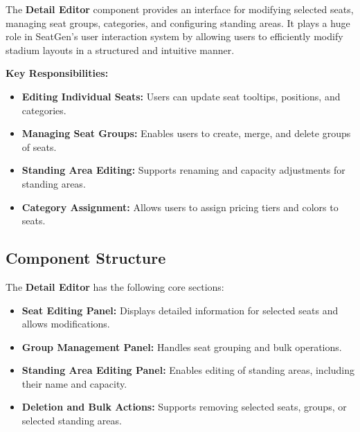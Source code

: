 The \textbf{Detail Editor} component provides an interface for modifying selected seats, managing seat groups, categories, and configuring standing areas. It plays a huge role in SeatGen’s user interaction system by allowing users to efficiently modify stadium layouts in a structured and intuitive manner.

\textbf{Key Responsibilities:}
\begin{itemize}
    \item \textbf{Editing Individual Seats:} Users can update seat tooltips, positions, and categories.
    \item \textbf{Managing Seat Groups:} Enables users to create, merge, and delete groups of seats.
    \item \textbf{Standing Area Editing:} Supports renaming and capacity adjustments for standing areas.
    \item \textbf{Category Assignment:} Allows users to assign pricing tiers and colors to seats.
\end{itemize}

\subsection{Component Structure}
The \textbf{Detail Editor} has the following core sections:
\begin{itemize}
    \item \textbf{Seat Editing Panel:} Displays detailed information for selected seats and allows modifications.
    \item \textbf{Group Management Panel:} Handles seat grouping and bulk operations.
    \item \textbf{Standing Area Editing Panel:} Enables editing of standing areas, including their name and capacity.
    \item \textbf{Deletion and Bulk Actions:} Supports removing selected seats, groups, or selected standing areas.
\end{itemize}

